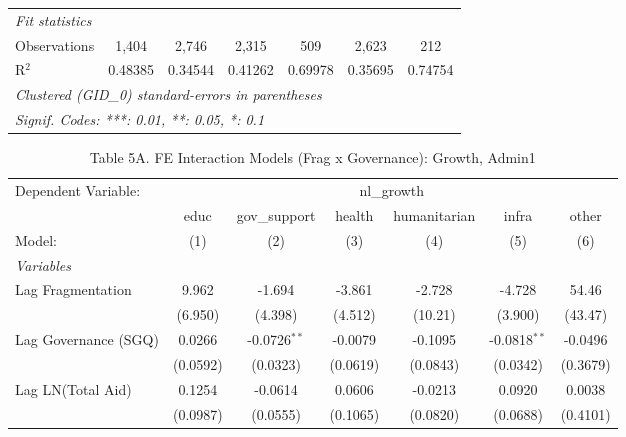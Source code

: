 \begin{tabular}{lcccccc}
   \midrule
   \emph{Fit statistics}\\
   Observations                       & 1,404    & 2,746          & 2,315         & 509          & 2,623          & 212\\  
   R$^2$                              & 0.48385  & 0.34544        & 0.41262       & 0.69978      & 0.35695        & 0.74754\\  
   \midrule \midrule
   \multicolumn{7}{l}{\emph{Clustered (GID\_0) standard-errors in parentheses}}\\
   \multicolumn{7}{l}{\emph{Signif. Codes: ***: 0.01, **: 0.05, *: 0.1}}\\
\end{tabular}
\par\endgroup



\begin{table}[htbp]
   \caption{Table 5A. FE Interaction Models (Frag x Governance): Growth, Admin1}
   \centering
   \begin{tabular}{lcccccc}
      \tabularnewline \midrule \midrule
      Dependent Variable: & \multicolumn{6}{c}{nl\_growth}\\
                                         & educ     & gov\_support   & health        & humanitarian & infra          & other \\   
      Model:                             & (1)      & (2)            & (3)           & (4)          & (5)            & (6)\\  
      \midrule
      \emph{Variables}\\
      Lag Fragmentation                  & 9.962    & -1.694         & -3.861        & -2.728       & -4.728         & 54.46\\   
                                         & (6.950)  & (4.398)        & (4.512)       & (10.21)      & (3.900)        & (43.47)\\   
      Lag Governance (SGQ)               & 0.0266   & -0.0726$^{**}$ & -0.0079       & -0.1095      & -0.0818$^{**}$ & -0.0496\\   
                                         & (0.0592) & (0.0323)       & (0.0619)      & (0.0843)     & (0.0342)       & (0.3679)\\   
      Lag LN(Total Aid)                  & 0.1254   & -0.0614        & 0.0606        & -0.0213      & 0.0920         & 0.0038\\   
                                         & (0.0987) & (0.0555)       & (0.1065)      & (0.0820)     & (0.0688)       & (0.4101)\\   

\end{tabular}
\end{table}
